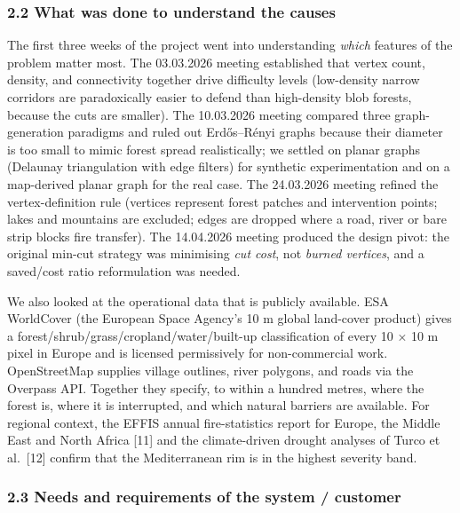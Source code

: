 \documentclass[
  11pt,
]{article}
\begin{document}
\subsubsection{2.2 What was done to understand the
causes}\label{what-was-done-to-understand-the-causes}

The first three weeks of the project went into understanding
\emph{which} features of the problem matter most. The 03.03.2026 meeting
established that vertex count, density, and connectivity together drive
difficulty levels (low-density narrow corridors are paradoxically easier
to defend than high-density blob forests, because the cuts are smaller).
The 10.03.2026 meeting compared three graph-generation paradigms and
ruled out Erdős--Rényi graphs because their diameter is too small to
mimic forest spread realistically; we settled on planar graphs (Delaunay
triangulation with edge filters) for synthetic experimentation and on a
map-derived planar graph for the real case. The 24.03.2026 meeting
refined the vertex-definition rule (vertices represent forest patches
and intervention points; lakes and mountains are excluded; edges are
dropped where a road, river or bare strip blocks fire transfer). The
14.04.2026 meeting produced the design pivot: the original min-cut
strategy was minimising \emph{cut cost}, not \emph{burned vertices}, and
a saved/cost ratio reformulation was needed.

We also looked at the operational data that is publicly available. ESA
WorldCover (the European Space Agency's 10 m global land-cover product)
gives a forest/shrub/grass/cropland/water/built-up classification of
every 10 × 10 m pixel in Europe and is licensed permissively for
non-commercial work. OpenStreetMap supplies village outlines, river
polygons, and roads via the Overpass API. Together they specify, to
within a hundred metres, where the forest is, where it is interrupted,
and which natural barriers are available. For regional context, the
EFFIS annual fire-statistics report for Europe, the Middle East and
North Africa {[}11{]} and the climate-driven drought analyses of Turco
et al.~{[}12{]} confirm that the Mediterranean rim is in the highest
severity band.

\subsubsection{2.3 Needs and requirements of the system /
customer}\label{needs-and-requirements-of-the-system-customer}
\end{document}
